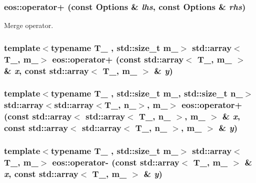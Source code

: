 \label{namespaceeos_a6025a42d446265afd81f6c749999a391}
\hypertarget{namespaceeos_a41f7ab5320df3415314366aef9a258bf}{
\subsubsection[{operator+}]{ eos::operator+ (const Options \& {\em lhs}, \/  const Options \& {\em rhs})}}
\label{namespaceeos_a41f7ab5320df3415314366aef9a258bf}


Merge operator. \hypertarget{namespaceeos_a77b0b1d58e1ff492fd660967a4dd6afa}{
\subsubsection[{operator+}]{\setlength{\rightskip}{0pt plus 5cm}template$<$typename T\_\- , std::size\_\-t m\_\-$>$ std::array$<$T\_\-, m\_\-$>$ eos::operator+ (const std::array$<$ T\_\-, m\_\- $>$ \& {\em x}, \/  const std::array$<$ T\_\-, m\_\- $>$ \& {\em y})}}
\label{namespaceeos_a77b0b1d58e1ff492fd660967a4dd6afa}
\hypertarget{namespaceeos_a0e3f5e761fbf126d8fcda142fed73318}{
\subsubsection[{operator+}]{\setlength{\rightskip}{0pt plus 5cm}template$<$typename T\_\- , std::size\_\-t m\_\-, std::size\_\-t n\_\-$>$ std::array$<$std::array$<$T\_\-, n\_\-$>$, m\_\-$>$ eos::operator+ (const std::array$<$ std::array$<$ T\_\-, n\_\- $>$, m\_\- $>$ \& {\em x}, \/  const std::array$<$ std::array$<$ T\_\-, n\_\- $>$, m\_\- $>$ \& {\em y})}}
\label{namespaceeos_a0e3f5e761fbf126d8fcda142fed73318}
\hypertarget{namespaceeos_aa8fefb77f2ab33ac602411123a62b956}{
\subsubsection[{operator-\/}]{\setlength{\rightskip}{0pt plus 5cm}template$<$typename T\_\- , std::size\_\-t m\_\-$>$ std::array$<$T\_\-, m\_\-$>$ eos::operator-\/ (const std::array$<$ T\_\-, m\_\- $>$ \& {\em x}, \/  const std::array$<$ T\_\-, m\_\- $>$ \& {\em y})}}
